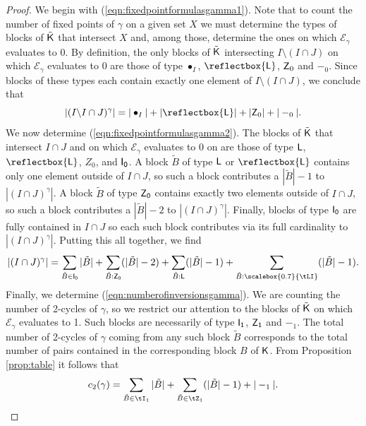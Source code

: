 \documentclass[11pt, a4paper, oneside, reqno]{amsart}
\newcommand{\sK}{{\sf K}}
\theoremstyle{remark}
\theoremstyle{definition}
\numberwithin{equation}{section}
\begin{document}
\begin{proof}
	We begin with (\ref{eqn:fixedpointformulasgamma1}). Note that to count the number of fixed points of $\gamma$ on a given set $X$ we must determine the types of blocks of $\tilde{\sf K}$ that intersect $X$ and, among those, determine the ones on which $\mathcal{E}_\gamma$ evaluates to 0. By definition, the only blocks of ${\tilde{\sf K}}$ intersecting $I \setminus (I \cap J)$ on which $\mathcal{E}_\gamma$ evaluates to 0 are those of type $\bullet_I$, $\reflectbox{\sf L}$, ${\sf Z}_0$ and $-_0$. Since blocks of these types each contain exactly one element of $I \setminus (I\cap J)$, we conclude that
	$$
		|(I\backslash I \cap J)^{\gamma}|= |\bullet_I| + |\reflectbox{\sf L}| + |{\sf Z}_{0}|+ |-_0|.
	$$
	We now determine (\ref{eqn:fixedpointformulasgamma2}). The blocks of $\tilde{\sf K}$ that intersect $I \cap J$ and on which $\mathcal{E}_\gamma$ evaluates to 0 on are those of type ${\sf L}$, $\reflectbox{\sf L}$, $Z_0$, and ${\sf I_0}$. A block $\tilde{B}$ of type ${\sf L}$ or $\reflectbox{\sf L}$ contains only one element outside of $I \cap J$, so such a block contributes a $|\tilde{B}|-1$ to $ |(I \cap J)^{\gamma}|$. A block $\tilde{B}$ of type ${\sf Z_0}$ contains exactly two elements outside of $I \cap J$, so such a block contributes a $|\tilde{B}|-2$ to $|(I \cap J)^{\gamma}|$. Finally, blocks of type ${\sf I_0}$ are fully contained in $I \cap J$ so each such block contributes via its full cardinality to $|(I \cap J)^{\gamma}|$. Putting this all together, we find
	$$
		|(I \cap J)^{\gamma}|= \sum_{\tilde{B}\in {\sf I_0}}|\tilde{B}| + \sum_{\tilde{B}:{\sf Z_0}}(|\tilde{B}|-2) + \sum_{\substack{\tilde{B}:{\sf L}}}(|\tilde{B}|-1) + \sum_{\substack{\tilde{B}:{\scalebox{0.7}{\tLI}}}}(|\tilde{B}|-1).
	$$
	Finally, we determine (\ref{eqn:numberofinversionsgamma}). We are counting the number of 2-cycles of $\gamma$, so we restrict our attention to the blocks of $\tilde{\sf K}$ on which $\mathcal{E}_\gamma$ evaluates to 1. Such blocks are necessarily of type ${\sf I_1}$, ${\sf Z_1}$ and $-_1$. The total number of 2-cycles of $\gamma$ coming from any such block $\tilde{B}$ corresponds to the total number of pairs contained in the corresponding block $B$ of $\sK$. From Proposition \ref{prop:table} it follows that
	$$
		c_2(\gamma)= \sum_{\tilde{B}\in{\tI_1}}|\tilde{B}| + \sum_{\tilde{B}\in{\tZ_1}}(|\tilde{B}| - 1) +|-_1|.
	$$
\end{proof}
\end{document}
